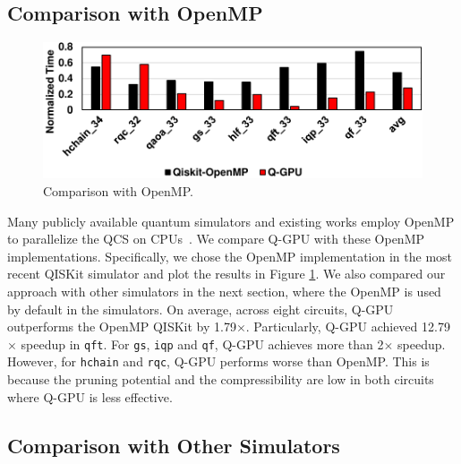 \subsection{Comparison with OpenMP}

\begin{figure}[h!]
	\centering
	\includegraphics[width=\textwidth]{Images/appendix2/section-5/cmp-openmp.pdf}
	\caption{Comparison with OpenMP.} 
	\label{fig:cmp-openmp}
	\vspace{-5pt}
\end{figure}

Many publicly available quantum simulators and existing works employ OpenMP to parallelize the QCS on CPUs~\cite{10.48550/arXiv.1710.05867,10.1109/HPCA51647.2021.00026,10.48550/arXiv.1601.07195}. 
We compare Q-GPU with these OpenMP implementations. Specifically, we chose the OpenMP implementation in the most recent QISKit simulator and plot the results in Figure  \ref{fig:cmp-openmp}. 
We also compared our approach with other simulators in the next section, where the OpenMP is used by default in the simulators. 
On average, across eight circuits, Q-GPU outperforms the OpenMP QISKit by 1.79$\times$. Particularly, Q-GPU achieved 12.79$\times$ speedup in {\tt qft}. For {\tt gs}, {\tt iqp} and {\tt qf}, Q-GPU achieves more than 2$\times$ speedup. However, for {\tt hchain} and {\tt rqc}, Q-GPU performs worse than OpenMP. This is because the pruning potential and the compressibility are low in both circuits where Q-GPU is less effective. %


\subsection{Comparison with Other Simulators}
\label{sec:others}

